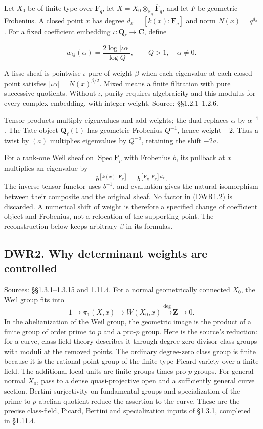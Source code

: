 Let \(X_0\) be of finite type over \(\mathbf F_q\), let
\(X=X_0\otimes_{\mathbf F_q}\overline{\mathbf F}_q\), and let \(F\) be
geometric Frobenius. A closed point \(x\) has degree
\(d_x=[k(x):\mathbf F_q]\) and norm \(N(x)=q^{d_x}\). For a fixed
coefficient embedding \(\iota:\overline{\mathbf Q}_\ell\to\mathbf C\),
define

\[
w_Q(\alpha)=\frac{2\log|\iota\alpha|}{\log Q},\qquad Q>1,\quad\alpha\ne0.
\tag{DWR1.1}
\]

A lisse sheaf is pointwise \(\iota\)-pure of weight \(\beta\) when each
eigenvalue at each closed point satisfies
\(|\iota\alpha|=N(x)^{\beta/2}\). Mixed means a finite filtration with
pure successive quotients. Without \(\iota\), purity requires
algebraicity and this modulus for every complex embedding, with integer
weight. Source: §§1.2.1--1.2.6.

Tensor products multiply eigenvalues and add weights; the dual replaces
\(\alpha\) by \(\alpha^{-1}\). The Tate object \(\mathbf Q_\ell(1)\) has
geometric Frobenius \(Q^{-1}\), hence weight \(-2\). Thus a twist by
\((a)\) multiplies eigenvalues by \(Q^{-a}\), retaining the shift
\(-2a\).

For a rank-one Weil sheaf on \(\operatorname{Spec}\mathbf F_p\) with
Frobenius \(b\), its pullback at \(x\) multiplies an eigenvalue by \[
b^{[k(x):\mathbf F_p]}=b^{[\mathbf F_q:\mathbf F_p]d_x}.
\tag{DWR1.2}
\] The inverse tensor functor uses \(b^{-1}\), and evaluation gives the
natural isomorphism between their composite and the original sheaf. No
factor in (DWR1.2) is discarded. A numerical shift of weight is
therefore a specified change of coefficient object and Frobenius, not a
relocation of the supporting point. The reconstruction below keeps
arbitrary \(\beta\) in its formulas.

\subsection{DWR2. Why determinant weights are
controlled}\label{dwr2.-why-determinant-weights-are-controlled}

Sources: §§1.3.1--1.3.15 and 1.11.4. For a normal geometrically
connected \(X_0\), the Weil group fits into \[
1\longrightarrow\pi_1(X,\bar x)\longrightarrow W(X_0,\bar x)
\xrightarrow{\deg}\mathbf Z\longrightarrow0.
\tag{DWR2.1}
\] In the abelianization of the Weil group, the geometric image is the
product of a finite group of order prime to \(p\) and a pro-\(p\) group.
Here is the source's reduction: for a curve, class field theory
describes it through degree-zero divisor class groups with moduli at the
removed points. The ordinary degree-zero class group is finite because
it is the rational-point group of the finite-type Picard variety over a
finite field. The additional local units are finite groups times
pro-\(p\) groups. For general normal \(X_0\), pass to a dense
quasi-projective open and a sufficiently general curve section. Bertini
surjectivity on fundamental groups and specialization of the
prime-to-\(p\) abelian quotient reduce the assertion to the curve. These
are the precise class-field, Picard, Bertini and specialization inputs
of §1.3.1, completed in §1.11.4.

